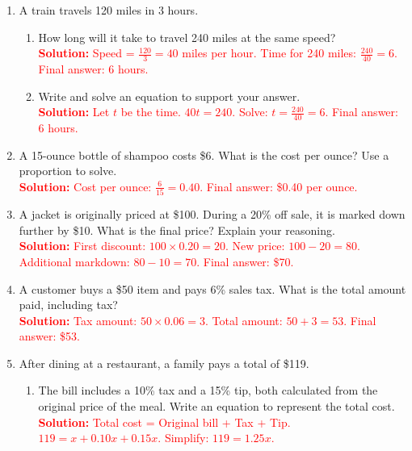 \documentclass[10pt]{article}
\begin{document}
\vspace{1em}
\begin{tcolorbox}[colframe=black!60, colback=white, 
coltitle=black, colbacktitle=black!15, fonttitle=\bfseries\Large, 
title=Problems, halign title=center, left=10pt, right=10pt, top=10pt, bottom=50pt]
\begin{enumerate}[start=9, itemsep=1em]
    \item A train travels 120 miles in 3 hours.  
    \begin{enumerate}[label=(\alph*)]
        \item How long will it take to travel 240 miles at the same speed?\\
        \textcolor{red}{\textbf{Solution:} Speed = \( \frac{120}{3} = 40\) miles per hour. Time for 240 miles: \( \frac{240}{40} = 6\). Final answer: 6 hours.}

        \item Write and solve an equation to support your answer.\\
        \textcolor{red}{\textbf{Solution:} Let \(t\) be the time. \(40t = 240\). Solve: \(t = \frac{240}{40} = 6\). Final answer: 6 hours.}
    \end{enumerate}

    \item A 15-ounce bottle of shampoo costs \$6. What is the cost per ounce? Use a proportion to solve.\\
    \textcolor{red}{\textbf{Solution:} Cost per ounce: \(\frac{6}{15} = 0.40\). Final answer: \$0.40 per ounce.}

    \item A jacket is originally priced at \$100. During a 20\% off sale, it is marked down further by \$10. What is the final price? Explain your reasoning.\\
    \textcolor{red}{\textbf{Solution:} First discount: \(100 \times 0.20 = 20\). New price: \(100 - 20 = 80\). Additional markdown: \(80 - 10 = 70\). Final answer: \$70.}

    \item A customer buys a \$50 item and pays 6\% sales tax. What is the total amount paid, including tax?\\
    \textcolor{red}{\textbf{Solution:} Tax amount: \(50 \times 0.06 = 3\). Total amount: \(50 + 3 = 53\). Final answer: \$53.}

    \item After dining at a restaurant, a family pays a total of \$119.  
    \begin{enumerate}[label=(\alph*)]
        \item The bill includes a 10\% tax and a 15\% tip, both calculated from the original price of the meal. Write an equation to represent the total cost.\\
        \textcolor{red}{\textbf{Solution:} Total cost = Original bill + Tax + Tip. \(119 = x + 0.10x + 0.15x\). Simplify: \(119 = 1.25x\).}


\end{enumerate}
\end{enumerate}
\end{tcolorbox}
\end{document}
